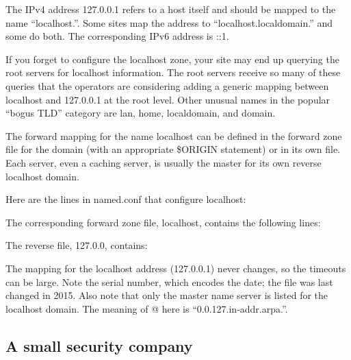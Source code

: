 The IPv4 address 127.0.0.1 refers to a host itself and should be mapped
to the name ``localhost.''. Some sites map the address to
``localhost.{localdomain}.'' and some do both. The corresponding IPv6
address is ::1.

If you forget to configure the localhost zone, your site may end up
querying the root servers for localhost information. The root servers
receive so many of these queries that the operators are considering
adding a generic mapping between localhost and 127.0.0.1 at the root
level. Other unusual names in the popular
``\protect\hypertarget{part0024_split_048.htmlux5cux23_idIndexMarker2217}{}{}bogus
TLD'' category are lan, home, localdomain, and domain.

The forward mapping for the name localhost can be defined in the forward
zone file for the domain (with an appropriate {\$ORIGIN} statement) or
in its own file. Each server, even a caching server, is usually the
master for its own reverse localhost domain.

Here are the lines in {named.conf} that configure localhost:


\protect\hypertarget{part0024_split_048.htmlux5cux23_idIndexMarker2218}{}{}The
corresponding forward zone file, {localhost}, contains the following
lines:


The reverse file, {127.0.0}, contains:


The mapping for the localhost address (127.0.0.1) never changes, so the
timeouts can be large. Note the serial number, which encodes the date;
the file was last changed in 2015. Also note that only the master name
server is listed for the localhost domain. The meaning of @ here is
``0.0.127.in-addr.arpa.''.

\protect\hypertarget{part0024_split_049.html}{}{}

\hypertarget{part0024_split_049.htmlux5cux23_idContainer1069}{}
\hypertarget{part0024_split_049.htmlux5cux23calibre_pb_48}{%
\subsection[A small security
company]{\texorpdfstring{\protect\hypertarget{part0024_split_049.htmlux5cux23_idTextAnchor925}{}{}A
small security
company}{A small security company}}\label{part0024_split_049.htmlux5cux23calibre_pb_48}}

